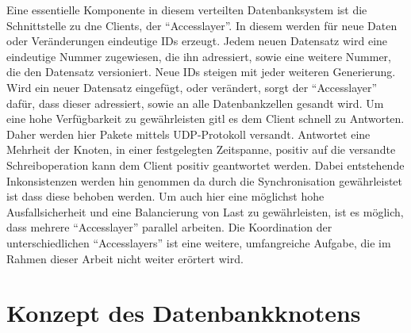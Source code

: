 \documentclass[a4paper,11pt,oneside,%
headsepline,												%
footsepline,												%
bibtotocnumbered									%
]{scrreprt}
\begin{document}
Eine essentielle Komponente in diesem verteilten Datenbanksystem ist die Schnittstelle zu dne Clients, der \enquote{Accesslayer}. In diesem werden für neue Daten oder Veränderungen eindeutige \ac{ID}s erzeugt. Jedem neuen Datensatz wird eine eindeutige Nummer zugewiesen, die ihn adressiert, sowie eine weitere Nummer, die den Datensatz versioniert. Neue \ac{ID}s steigen mit jeder weiteren Generierung. Wird ein neuer Datensatz eingefügt, oder verändert, sorgt der \enquote{Accesslayer} dafür, dass dieser adressiert, sowie an alle Datenbankzellen gesandt wird. Um eine hohe Verfügbarkeit zu gewährleisten gitl es dem Client schnell zu Antworten. Daher werden hier Pakete mittels UDP-Protokoll versandt. Antwortet eine Mehrheit der Knoten, in einer festgelegten Zeitspanne, positiv auf die versandte Schreiboperation kann dem Client positiv geantwortet werden. Dabei entstehende Inkonsistenzen werden hin genommen da durch die Synchronisation gewährleistet ist dass diese behoben werden. Um auch hier eine möglichst hohe Ausfallsicherheit und eine Balancierung von Last zu gewährleisten, ist es möglich, dass mehrere \enquote{Accesslayer} parallel arbeiten. Die Koordination der unterschiedlichen \enquote{Accesslayers} ist eine weitere, umfangreiche Aufgabe, die im Rahmen dieser Arbeit nicht weiter erörtert wird.

\section{Konzept des Datenbankknotens}
\label{sec:DBConcept} 
\end{document}
